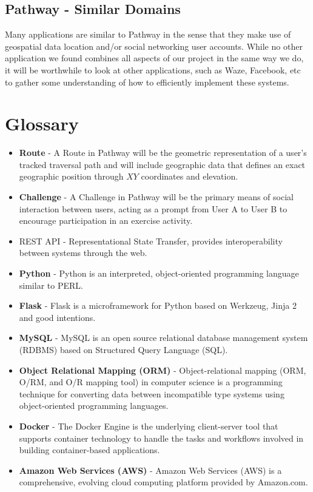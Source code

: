 ﻿\documentclass{article}
\begin{document}
\subsection{Pathway - Similar Domains}
Many applications are similar to Pathway in the sense that they make use of geospatial data location and/or social networking user accounts. While no other application we found combines all aspects of our project in the same way we do, it will be worthwhile to look at other applications, such as Waze, Facebook, etc to gather some understanding of how to efficiently implement these systems.

\section{Glossary}
\begin{itemize}
    \item \textbf{Route} - A Route in Pathway will be the geometric representation of a user’s tracked traversal path and will include geographic data that defines an exact geographic position through $XY$ coordinates and elevation.
    \item \textbf{Challenge} - A Challenge in Pathway will be the primary means of social interaction between users, acting as a prompt from User A to User B to encourage participation in an exercise activity.
    \item REST API - Representational State Transfer, provides interoperability between systems through the web.
    \item \textbf{Python} - Python is an interpreted, object-oriented programming language similar to PERL.
    \item \textbf{Flask} - Flask is a microframework for Python based on Werkzeug, Jinja 2 and good intentions.
    \item \textbf{MySQL} - MySQL is an open source relational database management system (RDBMS) based on Structured Query Language (SQL).
    \item \textbf{Object Relational Mapping (ORM)} - Object-relational mapping (ORM, O/RM, and O/R mapping tool) in computer science is a programming technique for converting data between incompatible type systems using object-oriented programming languages.
    \item \textbf{Docker} - The Docker Engine is the underlying client-server tool that supports container technology to handle the tasks and workflows involved in building container-based applications.
    \item \textbf{Amazon Web Services (AWS)} - Amazon Web Services (AWS) is a comprehensive, evolving cloud computing platform provided by Amazon.com.

\end{itemize}
\end{document}
